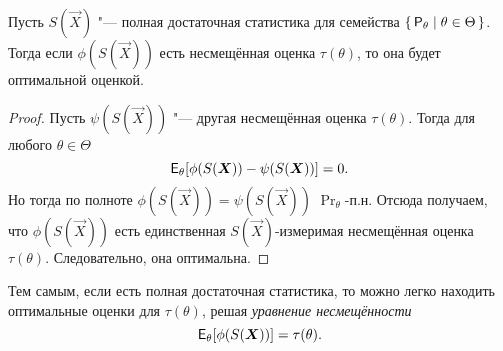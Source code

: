 \begin{theorem}
	Пусть $S(\vec{X})$ "--- полная достаточная статистика для семейства $\set{\mathsf{P}_{\theta} \mid \theta \in \Theta}$. Тогда если $\phi(S(\vec{X}))$ есть несмещённая оценка $\tau(\theta)$, то она будет оптимальной оценкой.
\end{theorem}
\begin{proof}
	Пусть $\psi(S(\vec{X}))$ "--- другая несмещённая оценка $\tau(\theta)$. Тогда для любого $\theta \in \Theta$
	\[
		\operatorname{\mathsf{E}}_{\theta}[\phi(S(\bm{X})) - \psi(S(\bm{X}))] = 0.
	\]
	Но тогда по полноте $\phi(S(\vec{X})) = \psi(S(\vec{X}))$ $\Pr_{\theta}$-п.н. Отсюда получаем, что $\phi(S(\vec{X}))$ есть единственная $S(\vec{X})$-измеримая несмещённая оценка $\tau(\theta)$. Следовательно, она оптимальна.
\end{proof}

Тем самым, если есть полная достаточная статистика, то можно легко находить оптимальные оценки для $\tau(\theta)$, решая \emph{уравнение несмещённости}
\[
	\operatorname{\mathsf{E}}_{\theta}[\phi(S(\bm{X}))] = \tau(\theta).
\]


